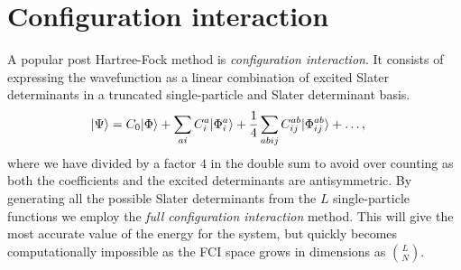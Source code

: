 \chapter{Configuration interaction}
     A popular post Hartree-Fock method is \textit{configuration interaction}.
     It consists of expressing the wavefunction as a linear combination of
     excited Slater determinants in a truncated single-particle and Slater
     determinant basis.
     \begin{align}
         | \Psi \rangle
         &= C_0| \Phi \rangle
         + \sum_{ai}C^a_i| \Phi^{a}_{i} \rangle
         + \frac{1}{4}\sum_{abij}C^{ab}_{ij}| \Phi^{ab}_{ij} \rangle
         + \dots,
     \end{align}
     where we have divided by a factor $4$ in the double sum to avoid over
     counting as both the coefficients and the excited determinants are
     antisymmetric. By generating all the possible Slater determinants from the
     $L$ single-particle functions we employ the \textit{full configuration
     interaction} method. This will give the most accurate value of the energy
     for the system, but quickly becomes computationally impossible as the FCI
     space grows in dimensions as $\binom{L}{N}$.
     \cite{kvaal2017notes}

